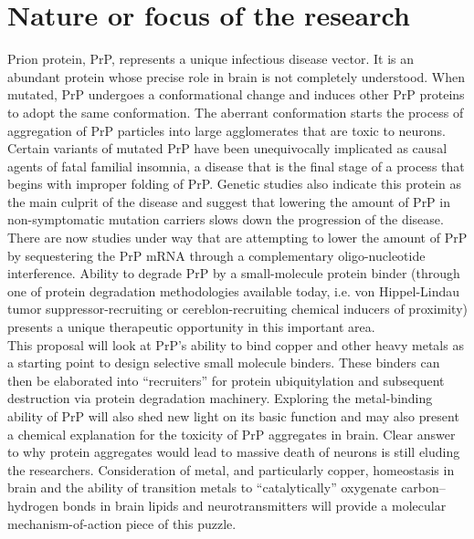 \documentclass{letter}
\begin{document}
\begin{letter}{}
\section{Nature or focus of the research}
Prion protein, PrP, represents a unique infectious disease vector. It is an abundant protein whose precise role in brain is not completely understood. When mutated, PrP undergoes a conformational change and induces other PrP proteins to adopt the same conformation. The aberrant conformation starts the process of aggregation of PrP particles into large agglomerates that are toxic to neurons. Certain variants of mutated PrP have been unequivocally implicated as causal agents of fatal familial insomnia, a disease that is the final stage of a process that begins with improper folding of PrP. Genetic studies also indicate this protein as the main culprit of the disease and suggest that lowering the amount of PrP in non-symptomatic mutation carriers slows down the progression of the disease.\citep{Aguzzi2009} \\There are now studies under way that are attempting to lower the amount of PrP by sequestering the PrP mRNA through a complementary oligo-nucleotide interference. Ability to degrade PrP by a small-molecule protein binder (through one of protein degradation methodologies available today, i.e. von Hippel-Lindau tumor suppressor-recruiting or cereblon-recruiting chemical inducers of proximity) presents a unique therapeutic opportunity in this important area. \\
This proposal will look at PrP's ability to bind copper and other heavy metals as a starting point to design selective small molecule binders. These binders can then be elaborated into ``recruiters'' for protein ubiquitylation and subsequent destruction via protein degradation machinery. Exploring the metal-binding ability of PrP will also shed new light on its basic function and may also present a chemical explanation for the toxicity of PrP aggregates in brain. Clear answer to why protein aggregates would lead to massive death of neurons is still eluding the researchers. Consideration of metal, and particularly copper, homeostasis in brain and the ability of transition metals to ``catalytically'' oxygenate carbon--hydrogen bonds\citep{Xiao2018} in brain lipids and neurotransmitters will provide a molecular mechanism-of-action piece of this puzzle.

\end{letter}
\end{document}
